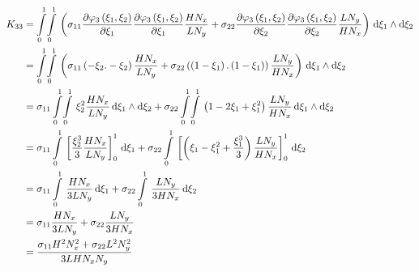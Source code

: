 \begin{equation}
  \begin{aligned}
    K_{33}&=\giint{0}{1}{0}{1}{\pbrac{\sigma_{11}\delby{\lbfn{3}{\xi_{1},\xi_{2}}}{\xi_{1}}\delby{\lbfn{3}{\xi_{1},\xi_{2}}}{\xi_{1}}
        \dfrac{H N_{x}}{L N_{y}}+\sigma_{22}\delby{\lbfn{3}{\xi_{1},\xi_{2}}}{\xi_{2}}\delby{\lbfn{3}{\xi_{1},\xi_{2}}}{\xi_{2}}
        \dfrac{L N_{y}}{H N_{x}}}}{\xi_{1}}{\xi_{2}}\\
    &=\giint{0}{1}{0}{1}{\pbrac{\sigma_{11}\pbrac{-\xi_{2}.-\xi_{2}}\dfrac{H N_{x}}{L N_{y}}+
    \sigma_{22}\pbrac{\pbrac{1-\xi_{1}}.\pbrac{1-\xi_{1}}}\dfrac{L N_{y}}{H N_{x}}}}{\xi_{1}}{\xi_{2}} \\
    &=\sigma_{11}\giint{0}{1}{0}{1}{\xi_{2}^{2}\dfrac{H N_{x}}{L N_{y}}}{\xi_{1}}{\xi_{2}}+
    \sigma_{22}\giint{0}{1}{0}{1}{\pbrac{1-2\xi_{1}+\xi_{1}^{2}}\dfrac{L N_{y}}{H N_{x}}}{\xi_{1}}{\xi_{2}} \\
    &=\sigma_{11}\gint{0}{1}{\sqbrac{\dfrac{\xi_{2}^{3}}{3}\dfrac{H N_{x}}{L N_{y}}}_{0}^{1}}{\xi_{1}}+
    \sigma_{22}\gint{0}{1}{\sqbrac{\pbrac{\xi_{1}-\xi_{1}^{2}+\dfrac{\xi_{1}^{3}}{3}}\dfrac{L N_{y}}{H N_{x}}}_{0}^{1}}{\xi_{2}} \\
    &=\sigma_{11}\gint{0}{1}{\dfrac{H N_{x}}{3 L N_{y}}}{\xi_{1}}+\sigma_{22}\gint{0}{1}{\dfrac{L N_{y}}{3 H N_{x}}}{\xi_{2}} \\
    &=\sigma_{11}\dfrac{H N_{x}}{3 L N_{y}}+\sigma_{22}\dfrac{L N_{y}}{3 H N_{x}} \\
    &=\dfrac{\sigma_{11}H^{2}N_{x}^{2}+\sigma_{22}L^{2}N_{y}^{2}}{3 L H N_{x} N_{y}}
  \end{aligned}
\end{equation}

